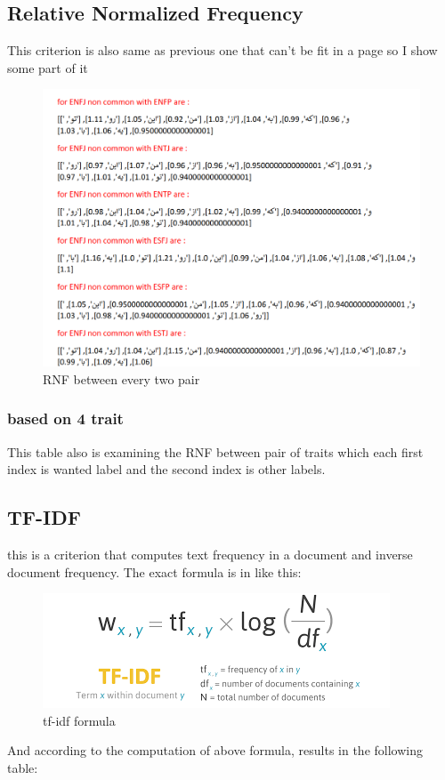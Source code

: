 \documentclass[10pt, a4paper]{article}
\newenvironment{Fa}{\begin{RTL}\faFont}{\end{RTL}}
\begin{document}
\subsection{Relative Normalized Frequency}
This criterion is also same as previous one that can't be fit in a page so I show some part of it
\begin{figure}[H]
    \centering
    \includegraphics[width=0.6\linewidth]{../stats/RNF.png}
    \caption{RNF between every two pair}
\end{figure}
\subsubsection{based on 4 trait}
This table also is examining the RNF between pair of traits which each first index is wanted label and the second index is other labels.
\\
\begin{Fa}
    \centering
    \begin{adjustbox}{max width=0.8\textwidth}
    \end{adjustbox}
\end{Fa}
\subsection{TF-IDF}
this is a criterion that computes text frequency in a document and inverse document frequency. The exact formula is in like this:
\begin{figure}[H]
    \begin{center}
        \includegraphics[width=0.8\linewidth]{images/tf-idf.png}
        \caption{tf-idf formula}
    \end{center}
\end{figure}
And according to the computation of above formula, results in the following table:
\\
\begin{Fa}
    \centering
    \begin{adjustbox}{max width=\textwidth,totalheight=6cm}
    \end{adjustbox}
\end{Fa}
\newpage
\end{document}
